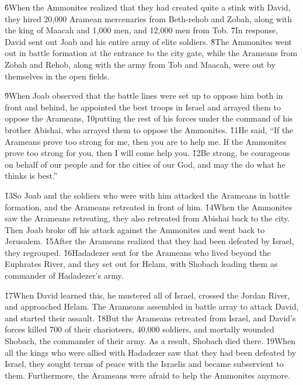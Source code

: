 \v{6}When the Ammonites realized that they had created quite a stink with David, they hired 20,000 Aramean mercenaries from Beth-rehob and Zobah, along with the king of Maacah and 1,000 men, and 12,000 men from Tob. \v{7}In response, David sent out Joab and his entire army of elite soldiers. \v{8}The Ammonites went out in battle formation at the entrance to the city gate, while the Arameans from Zobah and Rehob, along with the army from Tob and Maacah, were out by themselves in the open fields.

\v{9}When Joab observed that the battle lines were set up to oppose him both in front and behind, he appointed the best troops in Israel and arrayed them to oppose the Arameans, \v{10}putting the rest of his forces under the command of his brother Abishai, who arrayed them to oppose the Ammonites. \v{11}He said, ``If the Arameans prove too strong for me, then you are to help me. If the Ammonites prove too strong for you, then I will come help you. \v{12}Be strong, be courageous on behalf of our people and for the cities of our God, and may the  do what he thinks is best.''

\v{13}So Joab and the soldiers who were with him attacked the Arameans in battle formation, and the Arameans retreated in front of him. \v{14}When the Ammonites saw the Arameans retreating, they also retreated from Abishai back to the city. Then Joab broke off his attack against the Ammonites and went back to Jerusalem. \v{15}After the Arameans realized that they had been defeated by Israel, they regrouped. \v{16}Hadadezer sent for the Arameans who lived beyond the Euphrates River, and they set out for Helam, with Shobach leading them as commander of Hadadezer's army.

\v{17}When David learned this, he mustered all of Israel, crossed the Jordan River, and approached Helam. The Arameans assembled in battle array to attack David, and started their assault. \v{18}But the Arameans retreated from Israel, and David's forces killed 700 of their charioteers, 40,000 soldiers, and mortally wounded Shobach, the commander of their army. As a result, Shobach died there. \v{19}When all the kings who were allied with Hadadezer saw that they had been defeated by Israel, they sought terms of peace with the Israelis and became subservient to them. Furthermore, the Arameans were afraid to help the Ammonites anymore.

